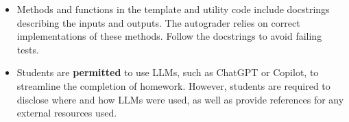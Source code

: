 \begin{itemize}
    \item
    Methods and functions in the template and utility code include
    docstrings describing the inputs and outputs.  The autograder
    relies on correct implementations of these methods.  Follow the
    docstrings to avoid failing tests.

    \item 
    Students are \textbf{permitted} to use LLMs, such as ChatGPT or Copilot, to streamline
    the completion of homework. However, students are required to disclose where and how LLMs
    were used, as well as provide references for any external resources used. 
\end{itemize}

